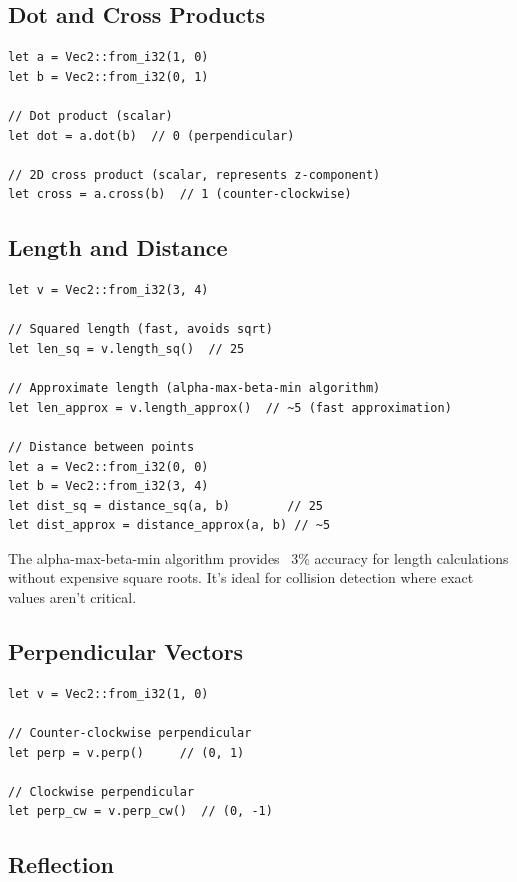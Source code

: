 \subsection{Dot and Cross Products}

\begin{lstlisting}
let a = Vec2::from_i32(1, 0)
let b = Vec2::from_i32(0, 1)

// Dot product (scalar)
let dot = a.dot(b)  // 0 (perpendicular)

// 2D cross product (scalar, represents z-component)
let cross = a.cross(b)  // 1 (counter-clockwise)
\end{lstlisting}

\subsection{Length and Distance}

\begin{lstlisting}
let v = Vec2::from_i32(3, 4)

// Squared length (fast, avoids sqrt)
let len_sq = v.length_sq()  // 25

// Approximate length (alpha-max-beta-min algorithm)
let len_approx = v.length_approx()  // ~5 (fast approximation)

// Distance between points
let a = Vec2::from_i32(0, 0)
let b = Vec2::from_i32(3, 4)
let dist_sq = distance_sq(a, b)        // 25
let dist_approx = distance_approx(a, b) // ~5
\end{lstlisting}

\begin{tipbox}
The alpha-max-beta-min algorithm provides ~3\% accuracy for length calculations without expensive square roots. It's ideal for collision detection where exact values aren't critical.
\end{tipbox}

\subsection{Perpendicular Vectors}

\begin{lstlisting}
let v = Vec2::from_i32(1, 0)

// Counter-clockwise perpendicular
let perp = v.perp()     // (0, 1)

// Clockwise perpendicular
let perp_cw = v.perp_cw()  // (0, -1)
\end{lstlisting}

\subsection{Reflection}

